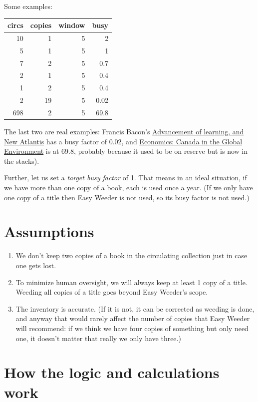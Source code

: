 \documentclass[11pt]{article}
\begin{document}
Some examples:

\begin{center}
\begin{tabular}{rrrr}
circs & copies & window & busy\\
\hline
10 & 1 & 5 & 2\\
5 & 1 & 5 & 1\\
7 & 2 & 5 & 0.7\\
2 & 1 & 5 & 0.4\\
1 & 2 & 5 & 0.4\\
2 & 19 & 5 & 0.02\\
698 & 2 & 5 & 69.8\\
\end{tabular}
\end{center}

The last two are real examples: Francis Bacon's \href{https://www.library.yorku.ca/find/Record/567179}{Advancement of learning, and New Atlantis} has a busy factor of 0.02, and \href{https://www.library.yorku.ca/find/Record/2914459}{Economics: Canada in the Global Environment} is at 69.8, probably because it used to be on reserve but is now in the stacks).

Further, let us set a \emph{target busy factor} of 1.  That means in an ideal situation, if we have more than one copy of a book, each is used once a year.  (If we only have one copy of a title then Easy Weeder is not used, so its busy factor is not used.)

\section*{Assumptions}
\label{sec:orgd0aaa06}

\begin{enumerate}
\item We don't keep two copies of a book in the circulating collection just in case one gets lost.
\item To minimize human oversight, we will always keep at least 1 copy of a title.  Weeding all copies of a title goes beyond Easy Weeder's scope.
\item The inventory is accurate.  (If it is not, it can be corrected as weeding is done, and anyway that would rarely affect the number of copies that Easy Weeder will recommend: if we think we have four copies of something but only need one, it doesn't matter that really we only have three.)
\end{enumerate}

\section*{How the logic and calculations work}
\label{sec:org73ddf2d}
\end{document}
